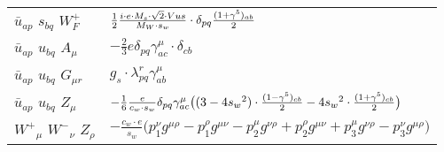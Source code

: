 \begin{center}
\begin{tabular}{|l|l|}
$\bar{u}{}_{a p }$ \phantom{-} $s{}_{b q }$ \phantom{-} $W^+_F{}_{}$ \phantom{-}  &
	$\frac{1}{2}\frac{ i \cdot e \cdot M_s \cdot\sqrt{2} \cdot Vus}{ M_W \cdot s_w}\cdot \delta_{p q} {(1+\gamma^5)_{a b}\over 2} $\\[2mm]
$\bar{u}{}_{a p }$ \phantom{-} $u{}_{b q }$ \phantom{-} ${A}_{\mu }$ \phantom{-}  &
	$-\frac{2}{3} e\delta_{p q} \gamma_{a c}^\mu \cdot \delta_{c b} $\\[2mm]
$\bar{u}{}_{a p }$ \phantom{-} $u{}_{b q }$ \phantom{-} ${G}_{\mu r }$ \phantom{-}  &
	$ g_s\cdot \lambda_{p q}^r \gamma_{a b}^\mu $\\[2mm]
$\bar{u}{}_{a p }$ \phantom{-} $u{}_{b q }$ \phantom{-} ${Z}_{\mu }$ \phantom{-}  &
	$-\frac{1}{6}\frac{ e}{ c_w \cdot s_w}\delta_{p q} \gamma_{a c}^\mu \big( (3-4 s_w {}^2)\cdot {(1-\gamma^5)_{c b}\over 2} -4 s_w{}^2 \cdot {(1+\gamma^5)_{c b}\over 2} \big)$\\[2mm]
$W^+{}_{\mu }$ \phantom{-} $W^-{}_{\nu }$ \phantom{-} ${Z}_{\rho }$ \phantom{-}  &
	$-\frac{ c_w \cdot e}{ s_w}\big(p_1^\nu g^{\mu \rho} -p_1^\rho g^{\mu \nu} -p_2^\mu g^{\nu \rho} +p_2^\rho g^{\mu \nu} +p_3^\mu g^{\nu \rho} -p_3^\nu g^{\mu \rho} \big)$\\ \hline
\end{tabular}


\end{center}
